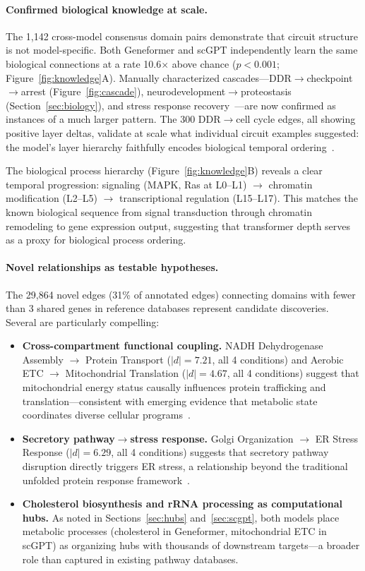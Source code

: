 \documentclass[onecolumn]{article}
\begin{document}
\paragraph{Confirmed biological knowledge at scale.}
The 1,142 cross-model consensus domain pairs demonstrate that circuit structure is not model-specific. Both Geneformer and scGPT independently learn the same biological connections at a rate 10.6$\times$ above chance ($p < 0.001$; Figure~\ref{fig:knowledge}A). Manually characterized cascades---DDR$\to$checkpoint$\to$arrest (Figure~\ref{fig:cascade}), neurodevelopment$\to$proteostasis (Section~\ref{sec:biology}), and stress response recovery~\citep{walter2011unfolded}---are now confirmed as instances of a much larger pattern. The 300 DDR$\to$cell cycle edges, all showing positive layer deltas, validate at scale what individual circuit examples suggested: the model's layer hierarchy faithfully encodes biological temporal ordering~\citep{ciccia2010ddr,jackson2009ddr}.

The biological process hierarchy (Figure~\ref{fig:knowledge}B) reveals a clear temporal progression: signaling (MAPK, Ras at L0--L1) $\to$ chromatin modification (L2--L5) $\to$ transcriptional regulation (L15--L17). This matches the known biological sequence from signal transduction through chromatin remodeling to gene expression output, suggesting that transformer depth serves as a proxy for biological process ordering.

\paragraph{Novel relationships as testable hypotheses.}
The 29,864 novel edges (31\% of annotated edges) connecting domains with fewer than 3 shared genes in reference databases represent candidate discoveries. Several are particularly compelling:

\begin{itemize}
\item \textbf{Cross-compartment functional coupling.} NADH Dehydrogenase Assembly $\to$ Protein Transport ($|d|{=}7.21$, all 4 conditions) and Aerobic ETC $\to$ Mitochondrial Translation ($|d|{=}4.67$, all 4 conditions) suggest that mitochondrial energy status causally influences protein trafficking and translation---consistent with emerging evidence that metabolic state coordinates diverse cellular programs~\citep{chandel2021mitochondria}.

\item \textbf{Secretory pathway$\to$stress response.} Golgi Organization $\to$ ER Stress Response ($|d|{=}6.29$, all 4 conditions) suggests that secretory pathway disruption directly triggers ER stress, a relationship beyond the traditional unfolded protein response framework~\citep{hetz2012unfolded}.

\item \textbf{Cholesterol biosynthesis and rRNA processing as computational hubs.} As noted in Sections~\ref{sec:hubs} and~\ref{sec:scgpt}, both models place metabolic processes (cholesterol in Geneformer, mitochondrial ETC in scGPT) as organizing hubs with thousands of downstream targets---a broader role than captured in existing pathway databases.
\end{itemize}
\end{document}

